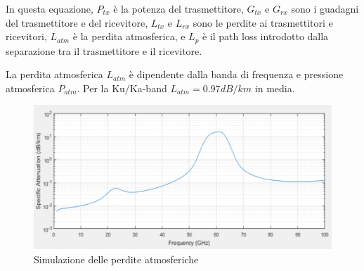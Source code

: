 In questa equazione, $P_{tx}$ è la potenza del trasmettitore, $G_{tx}$ e $G_{rx}$ sono i guadagni del trasmettitore e del ricevitore, $L_{tx}$ e $L_{rx}$ sono le perdite ai trasmettitori e ricevitori, $L_{atm}$ è la perdita atmosferica, e $L_{p}$ è il path loss introdotto dalla separazione tra il trasmettitore e il ricevitore.





La perdita atmosferica $L_{atm}$ è dipendente dalla banda di frequenza e pressione atmosferica $P_{atm}$.
Per la Ku/Ka-band $L_{atm} = 0.97 dB/km$ in media.

\begin{figure}[htbp]
  \centering
  \includegraphics[width=0.8\linewidth]{./res/img/atmospheric_losses_simulation.png}
  \caption{Simulazione delle perdite atmosferiche}
  \label{fig:atmospheric-losses-simulation}
\end{figure}

